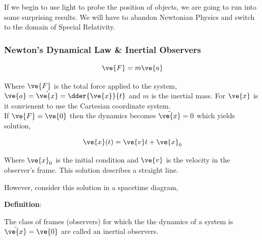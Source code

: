 \documentclass{article}
\newcommand{\heading}[1]{\vspace{0.1in}\textbf{#1}:}
\begin{document}
If we begin to use light to probe the position of objects, we are going to run into some surprising results. We will have to abandon Newtonian Physics and switch to the domain of Special Relativity.

\subsubsection{Newton's Dynamical Law \& Inertial Observers}

\[ \ve{F} = m \ve{a}\]

Where $\ve{F}$ is the total force applied to the system, $\ve{a} = \ddot{\ve{x}} = \dder{\ve{x}}{t}$ and $m$ is the inertial mass. For $\ve{x}$ is it convienent to use the Cartesian coordinate system. \\

If $\ve{F} = \ve{0}$ then the dynamics becomes $\ddot{\ve{x}} = 0$ which yields solution,

\[ \ve{x}(t) = \ve{v} t + \ve{x}_0 \]

Where $\ve{x}_0$ is the initial condition and $\ve{v}$ is the velocity in the observer's frame. This solution describes a straight line.

\begin{center}
\end{center}

However, consider this solution in a spacetime diagram,

\begin{center}
\end{center}

\heading{Definition}

The class of frames (observers) for which the the dynamics of a system is $\ddot{\ve{x}} = \ve{0}$ are called an inertial observers.
\end{document}
